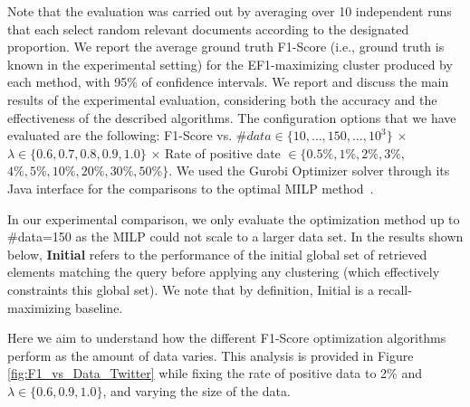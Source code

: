 Note that the evaluation was carried out by averaging over 10 independent runs that each select random relevant documents according to the designated proportion.  We report the average ground truth F1-Score (i.e., ground truth is known in the experimental setting) for the EF1-maximizing cluster produced by each method, with 95\% of confidence intervals. 
We report and discuss the main results of the experimental evaluation, considering both the accuracy and the effectiveness of the described algorithms. The configuration options that we have evaluated are the following: F1-Score vs. $\#data \in \{10,\dots, 150,\dots, 10^3\}$ $\times$ $ \lambda \in \{  0.6,0.7,0.8,0.9,1.0 \}$ $\times$ Rate of positive date $\in \{0.5\%, 1\%, 2\%, 3\%,$ $ 4\%, 5\%, 10\%, 20\%, 30\%, 50\%\}$. %
We used the Gurobi Optimizer solver through its Java interface for the comparisons to the optimal MILP method~\cite{gurobi2017gurobi}.

In our experimental comparison, we only  %
evaluate the optimization method up to \#data=150 as the MILP could not scale to a larger data set. In the results shown below, {\bf Initial} refers to the performance of the initial global set of retrieved elements matching the query before applying any clustering (which effectively constraints this global set).  We note that by definition, Initial is a recall-maximizing baseline.  







 Here we aim to understand how the different F1-Score optimization algorithms perform as the amount of data varies.  This analysis is provided in Figure  \ref{fig:F1_vs_Data_Twitter} while fixing the rate of positive data to 2\% and $\lambda \in \{0.6,0.9,1.0\}$, and  varying the size of the data.


